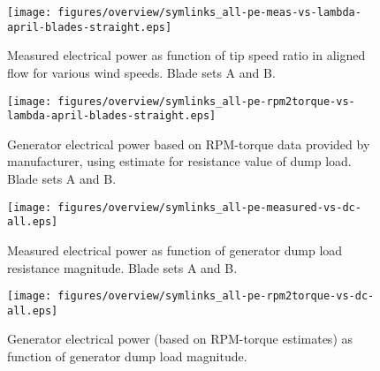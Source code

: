 \documentclass[a4paper]{jpconf}
\begin{document}
\begin{figure}[h]
\begin{minipage}{17pc}
\texttt{[image: figures/overview/symlinks\_all-pe-meas-vs-lambda-april-blades-straight.eps]}
\caption{\label{pe-meas-vs-lambda} Measured electrical power as function of tip speed ratio in aligned flow for various wind speeds. Blade sets A and B.}
\vspace{10px}
\end{minipage}\hspace{3pc}%
\begin{minipage}{17pc}
\texttt{[image: figures/overview/symlinks\_all-pe-rpm2torque-vs-lambda-april-blades-straight.eps]}
\caption{\label{pe-rpm2torque-vs-lambda} Generator electrical power based on RPM-torque data provided by manufacturer, using estimate for resistance value of dump load. Blade sets A and B.}
\end{minipage} 
\end{figure}


\begin{figure}[h]
\begin{minipage}{17pc}
\texttt{[image: figures/overview/symlinks\_all-pe-measured-vs-dc-all.eps]}
\caption{\label{pe-meas-vs-dc} Measured electrical power as function of generator dump load resistance magnitude. Blade sets A and B.}
\vspace{10px}
\end{minipage}\hspace{3pc}%
\begin{minipage}{17pc}
\texttt{[image: figures/overview/symlinks\_all-pe-rpm2torque-vs-dc-all.eps]}
\caption{\label{pe-rpm2torque-vs-dc} Generator electrical power (based on RPM-torque estimates) as function of generator dump load magnitude.}
\end{minipage} 
\end{figure}
\end{document}
